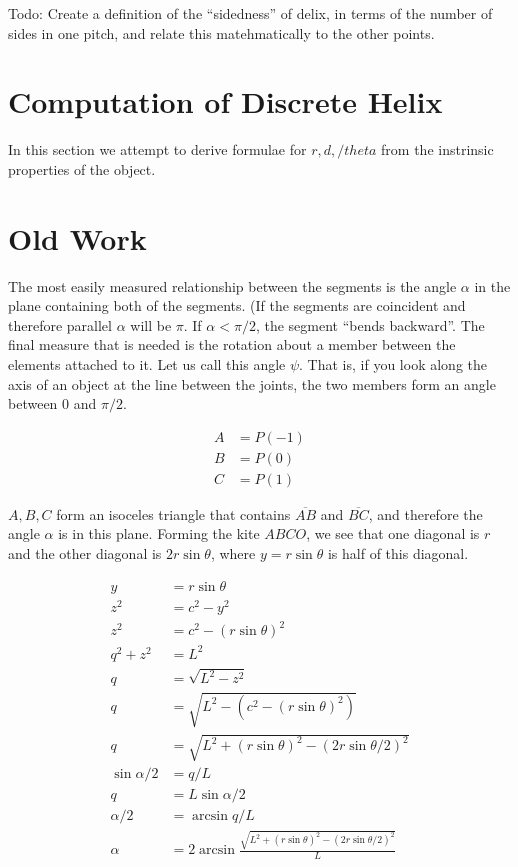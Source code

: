 \documentclass[11pt]{article}
\begin{document}
Todo: Create a definition of the ``sidedness'' of delix,
in terms of the number of sides in one pitch, and relate
this matehmatically to the other points.


\section{Computation of Discrete Helix}

In this section we attempt to derive formulae for $r,d,/theta$ from
the instrinsic properties of the object.

\section{Old Work}

The most easily measured relationship between the segments
is the angle $\alpha$ in the plane containing both of the segments. (If the segments are coincident and therefore
parallel $\alpha$ will be $\pi$. If $\alpha < \pi/2$, the segment ``bends backward''.
The final measure that is needed is the rotation about a member between the elements attached to it.
Let us call this angle $\psi$. That is, if you look along the axis of an object at the line
between the joints, the two members form an angle between 0 and $\pi /2$. 

\begin{align*}
    A &= P(-1)  \\
    B &= P(0) \\
    C &= P(1)
\end{align*}

$A,B,C$ form an isoceles triangle that contains $\overline{AB}$ and $\overline{BC}$, and therefore the angle $\alpha$ is in
this plane. Forming the kite $ABCO$, we see that one diagonal is $r$ and the other diagonal is $2 r \sin{\theta}$, where
$y = r \sin{\theta}$ is half of this diagonal. 

\begin{align*}
    y &= r \sin{\theta}  \\
    z^2 &= c^2 - y^2 \\
    z^2 &= c^2 - (r \sin{\theta})^2 \\    
    q^2 + z^2 &= L^2 \\
    q &= \sqrt{L^2 - z^2} \\
    q &= \sqrt{L^2 - (c^2- (r\sin{\theta})^2)} \\
    q &= \sqrt{L^2 + (r\sin{\theta})^2 - (2r\sin{\theta/2})^2 } \\        
    \sin{\alpha/2} &= q/L \\
    q &= L \sin{\alpha/2} \\
    \alpha/2 &= \arcsin{q/L} \\
    \alpha &= 2 \arcsin{\frac{\sqrt{L^2 + (r\sin{\theta})^2 -
          (2r\sin{\theta/2})^2}}
      {L}} \\ 
\end{align*}
\end{document}
